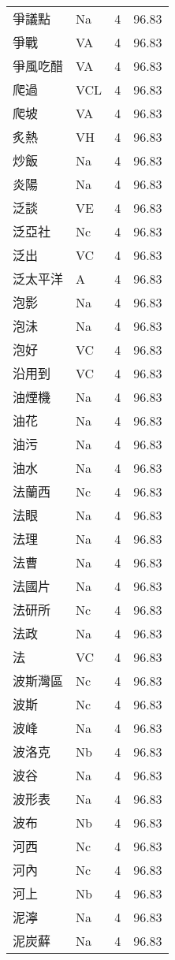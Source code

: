 \documentclass[twocolumn]{book}
\begin{document}
\begin{supertabular}{llrr}
爭議點 & Na & 4 &  96.83\\
爭戰 & VA & 4 &  96.83\\
爭風吃醋 & VA & 4 &  96.83\\
爬過 & VCL & 4 &  96.83\\
爬坡 & VA & 4 &  96.83\\
炙熱 & VH & 4 &  96.83\\
炒飯 & Na & 4 &  96.83\\
炎陽 & Na & 4 &  96.83\\
泛談 & VE & 4 &  96.83\\
泛亞社 & Nc & 4 &  96.83\\
泛出 & VC & 4 &  96.83\\
泛太平洋 & A & 4 &  96.83\\
泡影 & Na & 4 &  96.83\\
泡沬 & Na & 4 &  96.83\\
泡好 & VC & 4 &  96.83\\
沿用到 & VC & 4 &  96.83\\
油煙機 & Na & 4 &  96.83\\
油花 & Na & 4 &  96.83\\
油污 & Na & 4 &  96.83\\
油水 & Na & 4 &  96.83\\
法蘭西 & Nc & 4 &  96.83\\
法眼 & Na & 4 &  96.83\\
法理 & Na & 4 &  96.83\\
法曹 & Na & 4 &  96.83\\
法國片 & Na & 4 &  96.83\\
法研所 & Nc & 4 &  96.83\\
法政 & Na & 4 &  96.83\\
法 & VC & 4 &  96.83\\
波斯灣區 & Nc & 4 &  96.83\\
波斯 & Nc & 4 &  96.83\\
波峰 & Na & 4 &  96.83\\
波洛克 & Nb & 4 &  96.83\\
波谷 & Na & 4 &  96.83\\
波形表 & Na & 4 &  96.83\\
波布 & Nb & 4 &  96.83\\
河西 & Nc & 4 &  96.83\\
河內 & Nc & 4 &  96.83\\
河上 & Nb & 4 &  96.83\\
泥濘 & Na & 4 &  96.83\\
泥炭蘚 & Na & 4 &  96.83\\

\end{supertabular}
\end{document}
